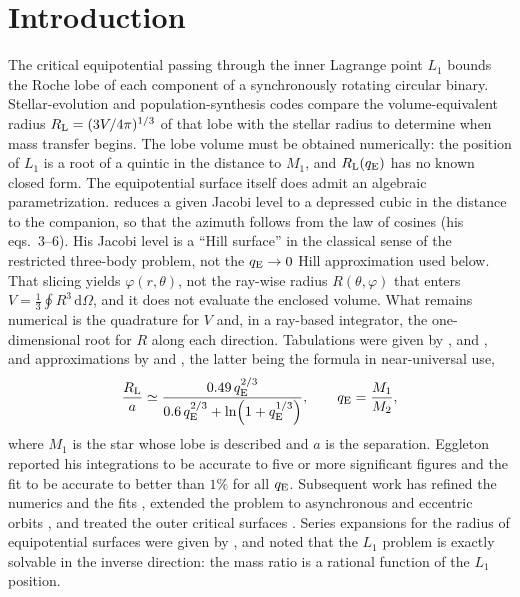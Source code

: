 \documentclass[twocolumn]{aastex702}
\newcommand{\qE}{q_{\rm E}}
\newcommand{\RL}{R_{\rm L}}
\newcommand{\dd}{\mathrm{d}}
\begin{document}

\section{Introduction}\label{sec:intro}

The critical equipotential passing through the inner Lagrange point $L_1$ bounds the Roche lobe of each component of a synchronously rotating circular binary. Stellar-evolution and population-synthesis codes compare the volume-equivalent radius $\RL=(3V/4\pi)^{1/3}$ of that lobe with the stellar radius to determine when mass transfer begins. The lobe volume must be obtained numerically: the position of $L_1$ is a root of a quintic in the distance to $M_1$, and $\RL(\qE)$ has no known closed form. The equipotential surface itself does admit an algebraic parametrization. \citet{Hure2026} reduces a given Jacobi level to a depressed cubic in the distance to the companion, so that the azimuth follows from the law of cosines (his eqs.~3--6). His Jacobi level is a ``Hill surface'' in the classical sense of the restricted three-body problem, not the $\qE\to0$ Hill approximation used below. That slicing yields $\varphi(r,\theta)$, not the ray-wise radius $R(\theta,\varphi)$ that enters $V=\tfrac13\oint R^3\,\dd\Omega$, and it does not evaluate the enclosed volume. What remains numerical is the quadrature for $V$ and, in a ray-based integrator, the one-dimensional root for $R$ along each direction. Tabulations were given by \citet{Kopal1959}, \citet{PlavecKratochvil1964} and \citet{Mochnacki1984}, and approximations by \citet{Paczynski1971} and \citet{Eggleton1983}, the latter being the formula in near-universal use,
\begin{equation}
\frac{\RL}{a}\simeq\frac{0.49\,\qE^{2/3}}{0.6\,\qE^{2/3}+\ln\!\left(1+\qE^{1/3}\right)},\qquad \qE=\frac{M_1}{M_2},
\label{eq:eggleton}
\end{equation}
where $M_1$ is the star whose lobe is described and $a$ is the separation. Eggleton reported his integrations to be accurate to five or more significant figures and the fit to be accurate to better than $1\%$ for all $\qE$. Subsequent work has refined the numerics and the fits \citep{Morris1994,LeahyLeahy2015,Qi2026}, extended the problem to asynchronous and eccentric orbits \citep{Sepinsky2007}, and treated the outer critical surfaces \citep{Marchant2021,Qi2026}. Series expansions for the radius of equipotential surfaces were given by \citet{PathaniaMedupe2012}, and \citet{Seidov2004} noted that the $L_1$ problem is exactly solvable in the inverse direction: the mass ratio is a rational function of the $L_1$ position.
\end{document}
